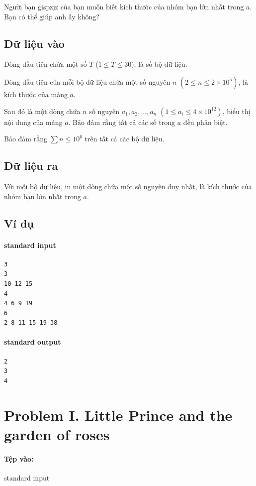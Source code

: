\documentclass[11pt]{article}
\begin{document}
Người bạn gispzjz của bạn muốn biết kích thước của nhóm bạn lớn nhất trong
\(a\). Bạn có thể giúp anh ấy không?

\subsection*{Dữ liệu vào}

Dòng đầu tiên chứa một số \(T\) (\(1\le T\le 30\)), là số bộ dữ liệu.

Dòng đầu tiên của mỗi bộ dữ liệu chứa một số nguyên \(n\)
\((2\le n\le 2\times 10^5)\), là kích thước của mảng \(a\).

Sau đó là một dòng chứa \(n\) số nguyên \(a_1,a_2,\ldots,a_n\)
\((1\le a_i\le 4\times 10^{12})\), biểu thị nội dung của mảng \(a\). Bảo đảm
rằng tất cả các số trong \(a\) đều phân biệt.

Bảo đảm rằng \(\sum n\le 10^6\) trên tất cả các bộ dữ liệu.

\subsection*{Dữ liệu ra}

Với mỗi bộ dữ liệu, in một dòng chứa một số nguyên duy nhất, là kích thước của
nhóm bạn lớn nhất trong \(a\).

\subsection*{Ví dụ}

\paragraph{standard input}
\begin{verbatim}
3
3
10 12 15
4
4 6 9 19
6
2 8 11 15 19 38
\end{verbatim}

\paragraph{standard output}
\begin{verbatim}
2
3
4
\end{verbatim}

\section{Problem I. Little Prince and the garden of roses}

\paragraph{Tệp vào:} standard input
\end{document}

